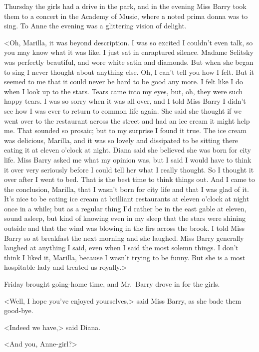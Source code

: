 Thursday the girls had a drive in the park, and in the evening Miss Barry took them to a concert in the Academy of Music, where a noted prima donna was to sing. To Anne the evening was a glittering vision of delight.

<Oh, Marilla, it was beyond description. I was so excited I couldn't even talk, so you may know what it was like. I just sat in enraptured silence. Madame Selitsky was perfectly beautiful, and wore white satin and diamonds. But when she began to sing I never thought about anything else. Oh, I can't tell you how I felt. But it seemed to me that it could never be hard to be good any more. I felt like I do when I look up to the stars. Tears came into my eyes, but, oh, they were such happy tears. I was so sorry when it was all over, and I told Miss Barry I didn't see how I was ever to return to common life again. She said she thought if we went over to the restaurant across the street and had an ice cream it might help me. That sounded so prosaic; but to my surprise I found it true. The ice cream was delicious, Marilla, and it was so lovely and dissipated to be sitting there eating it at eleven o'clock at night. Diana said she believed she was born for city life. Miss Barry asked me what my opinion was, but I said I would have to think it over very seriously before I could tell her what I really thought. So I thought it over after I went to bed. That is the best time to think things out. And I came to the conclusion, Marilla, that I wasn't born for city life and that I was glad of it. It's nice to be eating ice cream at brilliant restaurants at eleven o'clock at night once in a while; but as a regular thing I'd rather be in the east gable at eleven, sound asleep, but kind of knowing even in my sleep that the stars were shining outside and that the wind was blowing in the firs across the brook. I told Miss Barry so at breakfast the next morning and she laughed. Miss Barry generally laughed at anything I said, even when I said the most solemn things. I don't think I liked it, Marilla, because I wasn't trying to be funny. But she is a most hospitable lady and treated us royally.>

Friday brought going-home time, and Mr.~Barry drove in for the girls.

<Well, I hope you've enjoyed yourselves,> said Miss Barry, as she bade them good-bye.

<Indeed we have,> said Diana.

<And you, Anne-girl?>

